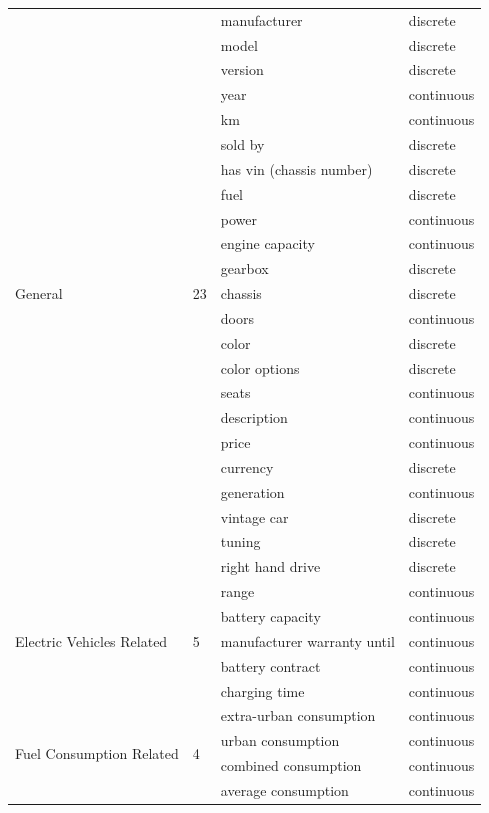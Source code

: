 \begin{longtable}{llll}
    \multirow{23}{*}{General} & \multirow{23}{*}{23} & manufacturer & discrete \\ 
    & & model & discrete \\ 
    & & version & discrete \\ 
    & & year & continuous \\ 
    & & km & continuous \\ 
    & & sold by & discrete \\ 
    & & has vin (chassis number) & discrete \\ 
    & & fuel & discrete \\ 
    & & power & continuous \\ 
    & & engine capacity & continuous \\ 
    & & gearbox & discrete \\ 
    & & chassis & discrete \\ 
    & & doors & continuous \\ 
    & & color & discrete \\ 
    & & color options & discrete \\ 
    & & seats & continuous \\ 
    & & description & continuous \\ 
    & & price & continuous \\ 
    & & currency & discrete \\ 
    & & generation & continuous \\ 
    & & vintage car & discrete \\ 
    & & tuning & discrete \\ 
    & & right hand drive & discrete \\ \hline
    
    \multirow{5}{*}{Electric Vehicles Related} & \multirow{5}{*}{5} & range & continuous \\ 
    & & battery capacity & continuous \\ 
    & & manufacturer warranty until & continuous \\ 
    & & battery contract & continuous \\ 
    & & charging time & continuous \\ \hline
    
    \multirow{4}{*}{Fuel Consumption Related} & \multirow{4}{*}{4} & extra-urban consumption & continuous \\ 
    & & urban consumption & continuous \\ 
    & & combined consumption & continuous \\ 
    & & average consumption & continuous \\ \hline
    

\end{longtable}
